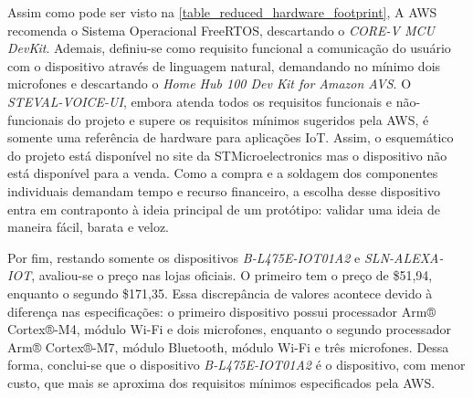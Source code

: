 Assim como pode ser visto na \autoref{table_reduced_hardware_footprint}, A AWS recomenda o Sistema Operacional FreeRTOS, descartando o \textit{CORE-V MCU DevKit}. Ademais, definiu-se como requisito funcional a comunicação do usuário com o dispositivo através de linguagem natural, demandando no mínimo dois microfones e descartando o \textit{Home Hub 100 Dev Kit for Amazon AVS}. O \textit{STEVAL-VOICE-UI}, embora atenda todos os requisitos funcionais e não-funcionais do projeto e supere os requisitos mínimos sugeridos pela AWS, é somente uma referência de hardware para aplicações IoT. Assim, o esquemático do projeto está disponível no site da STMicroelectronics mas o dispositivo não está disponível para a venda. Como a compra e a soldagem dos componentes individuais demandam tempo e recurso financeiro, a escolha desse dispositivo entra em contraponto à ideia principal de um protótipo: validar uma ideia de maneira fácil, barata e veloz.

Por fim, restando somente os dispositivos \textit{B-L475E-IOT01A2} e \textit{SLN-ALEXA-IOT}, avaliou-se o preço nas lojas oficiais. O primeiro tem o preço de \$51,94, enquanto o segundo \$171,35. Essa discrepância de valores acontece devido à diferença nas especificações: o primeiro dispositivo possui processador Arm® Cortex®-M4, módulo Wi-Fi e dois microfones, enquanto o segundo processador Arm® Cortex®-M7, módulo Bluetooth, módulo Wi-Fi e três microfones. Dessa forma, conclui-se que o dispositivo \textit{B-L475E-IOT01A2} é o dispositivo, com menor custo, que mais se aproxima dos requisitos mínimos especificados pela AWS.

